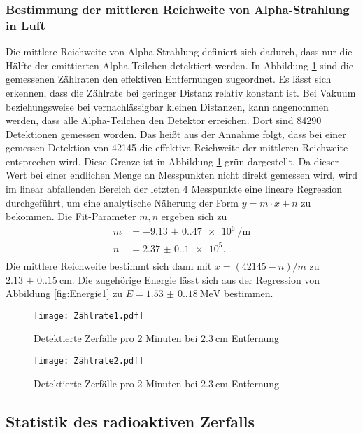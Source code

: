 \subsubsection{Bestimmung der mittleren Reichweite von Alpha-Strahlung in Luft}
Die mittlere Reichweite von Alpha-Strahlung definiert sich dadurch, dass nur die Hälfte der emittierten Alpha-Teilchen
detektiert werden. In Abbildung \ref{fig:Rate1} sind die gemessenen Zählraten den effektiven Entfernungen
zugeordnet. Es lässt sich erkennen, dass die Zählrate bei geringer Distanz relativ konstant ist. Bei Vakuum beziehungsweise
bei vernachlässigbar kleinen Distanzen, kann angenommen werden, dass alle Alpha-Teilchen den Detektor erreichen.
Dort sind 84290 Detektionen gemessen worden. Das heißt aus der Annahme folgt, dass bei einer gemessen Detektion von 42145
die effektive Reichweite der mittleren Reichweite entsprechen wird. Diese Grenze ist in Abbildung \ref{fig:Rate1} grün dargestellt.
Da dieser Wert bei einer endlichen Menge an Messpunkten nicht direkt gemessen wird, wird im linear abfallenden Bereich der letzten 4 Messpunkte 
eine lineare Regression durchgeführt, um eine analytische Näherung der Form $y=m\cdot x+n$
zu bekommen. Die Fit-Parameter $m,n$ ergeben sich zu
\begin{align*}
  m&=\qty{-9.13(0.47)e6}{\per\meter}\\
  n&=\num{2.37(0.10)e5}.\\
\end{align*}
Die mittlere Reichweite bestimmt sich dann mit $x=(42145-n)/m$ zu $\qty{2.13(0.15)}{\centi\meter}$.
Die zugehörige Energie lässt sich aus der Regression von Abbildung \ref{fig:Energie1} zu $E=\qty{1.53(0.18)}{\mega\electronvolt}$ bestimmen.
\begin{figure}[H]
  \centering
  \texttt{[image: Zählrate1.pdf]}
  \caption{Detektierte Zerfälle pro 2 Minuten bei $\qty{2.3}{\centi\meter}$ Entfernung}
  \label{fig:Rate1}
\end{figure}

\begin{figure}[H]
  \centering
  \texttt{[image: Zählrate2.pdf]}
  \caption{Detektierte Zerfälle pro 2 Minuten bei $\qty{2.3}{\centi\meter}$ Entfernung}
  \label{fig:Rate2}
\end{figure}

\subsection{Statistik des radioaktiven Zerfalls}

